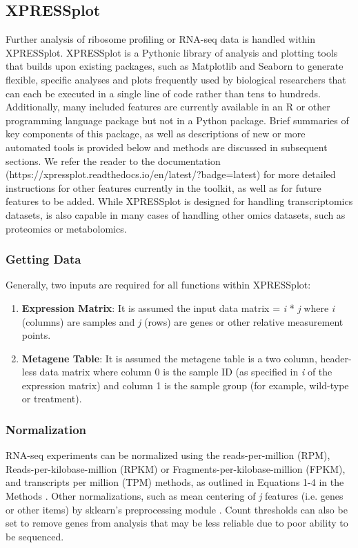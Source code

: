 \documentclass[11pt, a4paper, oneside]{article}
\begin{document}
\subsection{XPRESSplot}
Further analysis of ribosome profiling or RNA-seq data is handled within XPRESSplot. XPRESSplot is a Pythonic library of analysis and plotting tools that builds upon existing packages, such as Matplotlib \cite{matplotlib} and Seaborn \cite{seaborn} to generate flexible, specific analyses and plots frequently used by biological researchers that can each be executed in a single line of code rather than tens to hundreds. Additionally, many included features are currently available in an R or other programming language package but not in a Python package. Brief summaries of key components of this package, as well as descriptions of new or more automated tools is provided below and methods are discussed in subsequent sections. We refer the reader to the documentation (https://xpressplot.readthedocs.io/en/latest/?badge=latest) for more detailed instructions for other features currently in the toolkit, as well as for future features to be added. While XPRESSplot is designed for handling transcriptomics datasets, is also capable in many cases of handling other omics datasets, such as proteomics or metabolomics.

\subsubsection{Getting Data}
Generally, two inputs are required for all functions within XPRESSplot:

\begin{enumerate}
  \item \textbf{Expression Matrix}: It is assumed the input data matrix = \textit{i} * \textit{j} where \textit{i} (columns) are samples and \textit{j} (rows) are genes or other relative measurement points.
  \item \textbf{Metagene Table}: It is assumed the metagene table is a two column, header-less data matrix where column 0 is the sample ID (as specified in \textit{i} of the expression matrix) and column 1 is the sample group (for example, wild-type or treatment).
\end{enumerate}

\subsubsection{Normalization}
RNA-seq experiments can be normalized using the reads-per-million (RPM), Reads-per-kilobase-million (RPKM) or Fragments-per-kilobase-million (FPKM), and transcripts per million (TPM) methods, as outlined in Equations 1-4 in the Methods \cite{evans_briefbio}. Other normalizations, such as mean centering of \textit{j} features (i.e. genes or other items) by sklearn's preprocessing module \cite{scikit_learn}. Count thresholds can also be set to remove genes from analysis that may be less reliable due to poor ability to be sequenced.
\end{document}
